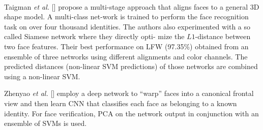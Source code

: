 \\
\par
Taigman \textit{et al.} [] propose a multi-stage approach that aligns faces to a general 3D shape model. A multi-class net-work is trained to perform the face recognition task on over four thousand identities. The authors also experimented with a so called Siamese network where they directly opti-
mize the $L1$-distance between two face features. Their best performance on LFW (97.35\%) obtained from an ensemble of three networks using different alignments and color channels. The predicted distances (non-linear SVM predictions) of those networks are combined using a non-linear SVM.
\\
\par
Zhenyao \textit{et al.} [] employ a deep network  to “warp” faces into a canonical frontal view and then learn CNN that classifies each face as belonging to a known identity. For face verification, PCA on the network output in conjunction with an ensemble of SVMs is used.
